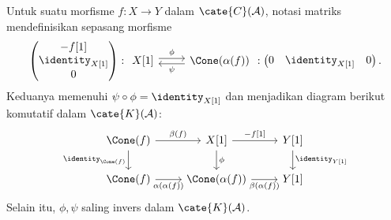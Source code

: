 \begin{lema}\label{prop:cone-alpha}
	Untuk suatu morfisme $f:X\to Y$ dalam $\cate{C}(\mathcal{A})$, notasi
	matriks mendefinisikan sepasang morfisme
	\[ \begin{pmatrix} -f[1] \\ \identity_{X[1]} \\ 0 \end{pmatrix} : \begin{tikzcd} X[1] \arrow[r, shift left, "\phi"] & \Cone(\alpha(f)) \arrow[l, shift left, "\psi"] \end{tikzcd} : \begin{pmatrix} 0 & \identity_{X[1]} & 0 \end{pmatrix}. \]
	Keduanya memenuhi $\psi\circ\phi=\identity_{X[1]}$ dan menjadikan diagram
	berikut komutatif dalam $\cate{K}(\mathcal{A})$:
	\[\begin{tikzcd}
		\Cone(f) \arrow[d, "{\identity_{\Cone(f)}}"'] \arrow[r, "\beta(f)"] & X[1] \arrow[d, "\phi"] \arrow[r, "{-f[1]}"] & Y[1] \arrow[d, "{\identity_{Y[1]}}"] \\
		\Cone(f) \arrow[r, "{\alpha(\alpha(f))}"'] & \Cone(\alpha(f)) \arrow[r, "\beta(\alpha(f))"'] & Y[1]
	\end{tikzcd}\]
	Selain itu, $\phi,\psi$ saling invers dalam $\cate{K}(\mathcal{A})$.
\end{lema}

